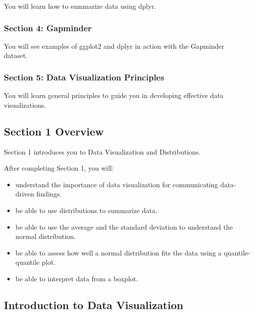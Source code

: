 \documentclass[
]{article}
\providecommand{\tightlist}{%
  \setlength{\itemsep}{0pt}\setlength{\parskip}{0pt}}
\begin{document}
You will learn how to summarize data using dplyr.

\hypertarget{section-4-gapminder}{%
\subsubsection{Section 4: Gapminder}\label{section-4-gapminder}}

You will see examples of ggplot2 and dplyr in action with the Gapminder
dataset.

\hypertarget{section-5-data-visualization-principles}{%
\subsubsection{Section 5: Data Visualization
Principles}\label{section-5-data-visualization-principles}}

You will learn general principles to guide you in developing effective
data visualizations.

\hypertarget{section-1-overview}{%
\subsection{Section 1 Overview}\label{section-1-overview}}

Section 1 introduces you to Data Visualization and Distributions.

After completing Section 1, you will:

\begin{itemize}
\tightlist
\item
  understand the importance of data visualization for communicating
  data-driven findings.
\item
  be able to use distributions to summarize data.
\item
  be able to use the average and the standard deviation to understand
  the normal distribution.
\item
  be able to assess how well a normal distribution fits the data using a
  quantile-quantile plot.
\item
  be able to interpret data from a boxplot.
\end{itemize}

\hypertarget{introduction-to-data-visualization}{%
\subsection{Introduction to Data
Visualization}\label{introduction-to-data-visualization}}
\end{document}
